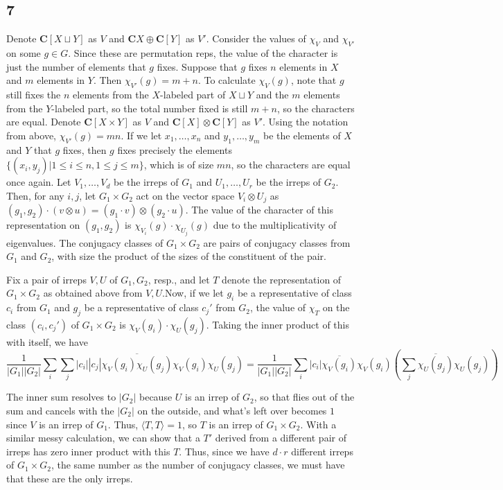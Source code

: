 \documentclass{article}
\newcommand{\conj}{\overline}
\begin{document}
\subsection*{7}
Denote $\mathbf{C}[X\sqcup Y]$ as $V$ and $\mathbf{C}{X}\oplus\mathbf{C}[Y]$ as $V'$. Consider the values of $\chi_V$ and $\chi_{V'}$ on some $g\in G$. 
Since these are permutation reps, the value of the character is just the number of elements that $g$ fixes. Suppose that $g$ fixes $n$ elements in $X$ and $m$ elements in $Y$. Then $\chi_{V'}(g)=m+n$. 
To calculate $\chi_V(g)$, note that $g$ still fixes the $n$ elements from the $X$-labeled part of $X\sqcup Y$ and the $m$ elements from the $Y$-labeled part, so the total number fixed is still $m+n$, so the characters are equal.
Denote $\mathbf{C}[X\times Y]$ as $V$ and $\mathbf{C}[X]\otimes\mathbf{C}[Y]$ as $V'$. Using the notation from above, $\chi_{V'}(g)=mn$. If we let $x_1,\ldots,x_n$ and $y_1,\ldots,y_m$ be the elements of $X$ and $Y$ that $g$ fixes, then $g$ fixes precisely the elements $\{(x_i,y_j)|1\leq i\leq n, 1\leq j\leq m\}$, which is of size $mn$, so the characters are equal once again.
Let $V_1,\ldots,V_d$ be the irreps of $G_1$ and $U_1,\ldots,U_r$ be the irreps of $G_2$. Then, for any $i,j$, let $G_1\times G_2$ act on the vector space $V_i\otimes U_j$ as $(g_1,g_2)\cdot(v\otimes u)=(g_1\cdot v)\otimes(g_2\cdot u)$. The value of the character of this representation on $(g_1,g_2)$ is $\chi_{V_i}(g)\cdot\chi_{U_j}(g)$ due to the multiplicativity of eigenvalues. The conjugacy classes of $G_1\times G_2$ are pairs of conjugacy classes from $G_1$ and $G_2$, with size the product of the sizes of the constituent of the pair. 

Fix a pair of irreps $V,U$ of $G_1,G_2$, resp., and let $T$ denote the representation of $G_1\times G_2$ as obtained above from $V,U$.Now, if we let $g_i$ be a representative of class $c_i$ from $G_1$ and $g_j$ be a representative of class $c_j'$ from $G_2$, the value of $\chi_T$ on the class $(c_i,c_j')$ of $G_1\times G_2$ is $\chi_V(g_i)\cdot\chi_U(g_j)$. Taking the inner product of this with itself, we have
\[
    \frac{1}{|G_1||G_2|} \sum_{i}\sum_{j} |c_i||c_j|\conj{\chi_V(g_i)\chi_U(g_j)}\chi_V(g_i)\chi_U(g_j)=\frac{1}{|G_1||G_2|}\sum_i |c_i|\conj{\chi_V(g_i)}\chi_V(g_i)\left(\sum_j\conj{\chi_U(g_j)}\chi_U(g_j)\right)
\]

The inner sum resolves to $|G_2|$ because $U$ is an irrep of $G_2$, so that flies out of the sum and cancels with the $|G_2|$ on the outside, and what's left over becomes $1$ since $V$ is an irrep of $G_1$. Thus, $\langle T,T\rangle=1$, so $T$ is an irrep of $G_1\times G_2$. With a similar messy calculation, we can show that a $T'$ derived from a different pair of irreps has zero inner product with this $T$. Thus, since we have $d\cdot r$ different irreps of $G_1\times G_2$, the same number as the number of conjugacy classes, we must have that these are the only irreps.
\end{document}
